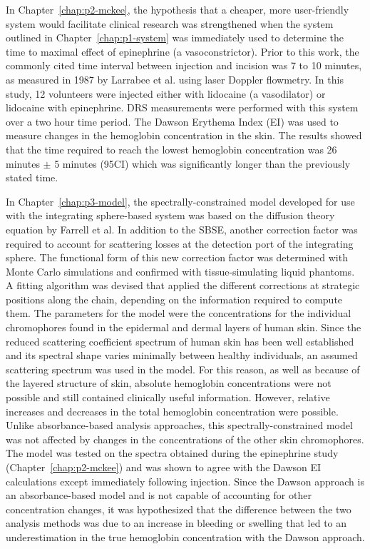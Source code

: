 In Chapter~\ref{chap:p2-mckee}, the hypothesis that a cheaper, more user-friendly system would facilitate clinical research was strengthened when the system outlined in Chapter~\ref{chap:p1-system} was immediately used to determine the time to maximal effect of epinephrine (a vasoconstrictor). Prior to this work, the commonly cited time interval between injection and incision was 7 to 10 minutes, as measured in 1987 by Larrabee et al.\cite{Larrabee1987} using laser Doppler flowmetry. In this study, 12 volunteers were injected either with lidocaine (a vasodilator) or lidocaine with epinephrine. DRS measurements were performed with this system over a two hour time period. The Dawson Erythema Index (EI)\cite{Dawson1980} was used to measure changes in the hemoglobin concentration in the skin. The results showed that the time required to reach the lowest hemoglobin concentration was 26 minutes $\pm$ 5 minutes (95CI) which was significantly longer than the previously stated time.

In Chapter~\ref{chap:p3-model}, the spectrally-constrained model developed for use with the integrating sphere-based system was based on the diffusion theory equation by Farrell et al.\cite{Farrell1992} In addition to the SBSE, another correction factor was required to account for scattering losses at the detection port of the integrating sphere. The functional form of this new correction factor was determined with Monte Carlo simulations and confirmed with tissue-simulating liquid phantoms. A fitting algorithm was devised that applied the different corrections at strategic positions along the chain, depending on the information required to compute them. The parameters for the model were the concentrations for the individual chromophores found in the epidermal and dermal layers of human skin. Since the reduced scattering coefficient spectrum of human skin has been well established and its spectral shape varies minimally between healthy individuals, an assumed scattering spectrum was used in the model. For this reason, as well as because of the layered structure of skin, absolute hemoglobin concentrations were not possible and still contained clinically useful information. However, relative increases and decreases in the total hemoglobin concentration were possible. Unlike absorbance-based analysis approaches, this spectrally-constrained model was not affected by changes in the concentrations of the other skin chromophores. The model was tested on the spectra obtained during the epinephrine study (Chapter~\ref{chap:p2-mckee}) and was shown to agree with the Dawson EI calculations except immediately following injection. Since the Dawson approach is an absorbance-based model and is not capable of accounting for other concentration changes, it was hypothesized that the difference between the two analysis methods was due to an increase in bleeding or swelling that led to an underestimation in the true hemoglobin concentration with the Dawson approach. 

